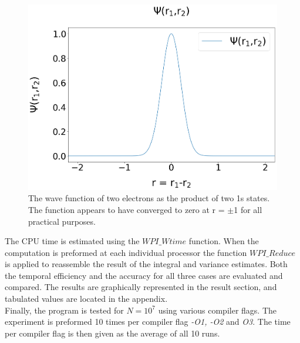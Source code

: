 \documentclass[%
reprint,nofootinbib,
amsmath,amssymb,
aps,
]{revtex4-1}
\begin{document}
\begin{figure}[!hb]
	\includegraphics[width=\columnwidth]{Wavefunction.png}
	\caption{\label{wavefigure} The wave function of two electrons as the product of two 1s states. The function appears to have converged to zero at r = $\pm$1 for all practical purposes.}
\end{figure}
 The CPU time is estimated using the $WPI\_Wtime$ function. When the computation is preformed at each individual processor the function $WPI\_Reduce$ is applied to reassemble the result of the integral and variance estimates. Both the temporal efficiency and the accuracy for all three cases are evaluated and compared. The results are graphically represented in the result section, and tabulated values are located in the appendix. \\ \indent 
 Finally, the program is tested for $N=10^7$ using various compiler flags. The experiment is preformed 10 times per compiler flag \textit{-O1, -O2} and \textit{O3}. The time per compiler flag is then given as the average of all 10 runs. 
 
\end{document}
